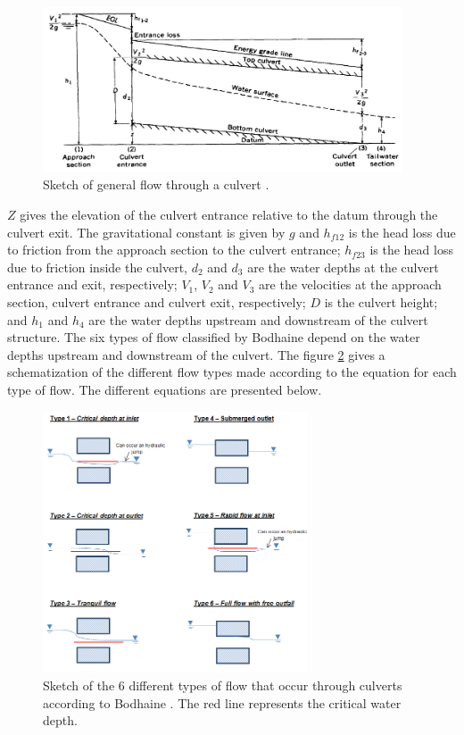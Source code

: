 \begin{figure}[H]
\begin{center}
  \includegraphics[width=0.95\textwidth]{graphics/culvert_fig2.png}
\end{center}
\caption{Sketch of general flow through a culvert \cite{Bodhaine1968}.}
\label{fig:culvert_fig2}
\end{figure}

$Z$ gives the elevation of the culvert entrance relative to the datum through the culvert exit.
The gravitational constant is given by $g$ and $h_{f12}$ is the head loss due to friction from
the approach section to the culvert entrance;
$h_{f23}$ is the head loss due to friction inside the culvert, $d_2$ and $d_3$ are the water
depths at the culvert entrance and exit, respectively;
$V_1$, $V_2$ and $V_3$ are the velocities at the approach section,
culvert entrance and culvert exit, respectively;
$D$ is the culvert height;
and $h_1$ and $h_4$ are the water depths upstream and downstream of the culvert structure.
The six types of flow classified by Bodhaine \cite{Bodhaine1968} depend on the water depths
upstream and downstream of the culvert.
The figure \ref{fig:culvert_fig3} gives a schematization of the different flow types
made according to the equation for each type of flow.
The different equations are presented below.

\begin{figure}[H]
\begin{center}
  \includegraphics[width=0.7\textwidth]{graphics/culvert_fig3.png}
\end{center}
\caption{Sketch of the 6 different types of flow that occur
through culverts according to Bodhaine \cite{Bodhaine1968}.
The red line represents the critical water depth.}
\label{fig:culvert_fig3}
\end{figure}

